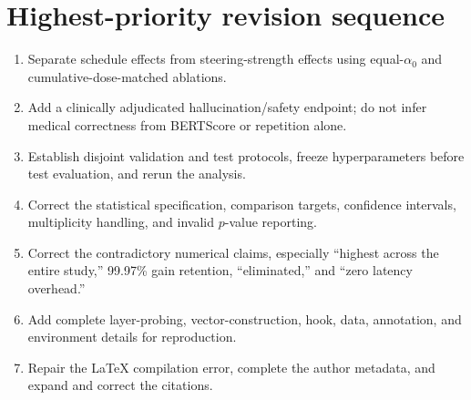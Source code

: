 \documentclass[11pt]{article}
\begin{document}
\section*{Highest-priority revision sequence}

\begin{enumerate}
    \item Separate schedule effects from steering-strength effects using equal-$\alpha_0$ and cumulative-dose-matched ablations.
    \item Add a clinically adjudicated hallucination/safety endpoint; do not infer medical correctness from BERTScore or repetition alone.
    \item Establish disjoint validation and test protocols, freeze hyperparameters before test evaluation, and rerun the analysis.
    \item Correct the statistical specification, comparison targets, confidence intervals, multiplicity handling, and invalid $p$-value reporting.
    \item Correct the contradictory numerical claims, especially ``highest across the entire study,'' 99.97\% gain retention, ``eliminated,'' and ``zero latency overhead.''
    \item Add complete layer-probing, vector-construction, hook, data, annotation, and environment details for reproduction.
    \item Repair the LaTeX compilation error, complete the author metadata, and expand and correct the citations.
\end{enumerate}
\end{document}
